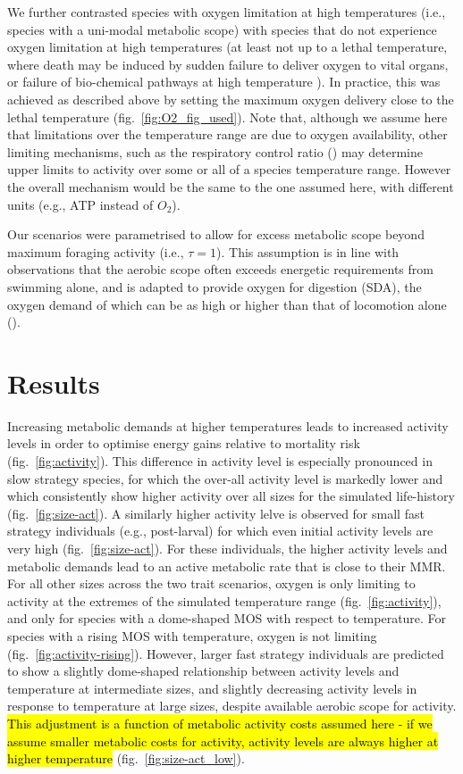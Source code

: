 \documentclass[11pt]{article}\usepackage[]{graphicx}\usepackage[]{color,soul}
\begin{document}
We further contrasted species with oxygen limitation at high temperatures (i.e., species with a uni-modal metabolic scope) with species that do not experience oxygen limitation at high temperatures (at least not up to a lethal temperature, where death may be induced by sudden failure to deliver oxygen to vital organs, or failure of bio-chemical pathways at high temperature \citealt{salin_inadequate_2016,iftikar_mitochondria_2013}). In practice, this was achieved as described above by setting the maximum oxygen delivery close to the lethal temperature (fig.~\ref{fig:O2_fig_used}). Note that, although we assume here that limitations over the temperature range are due to oxygen availability, other limiting mechanisms, such as the respiratory control ratio (\citealt{salin_inadequate_2016,iftikar_mitochondria_2013}) may determine upper limits to activity over some or all of a species temperature range. However the overall mechanism would be the same to the one assumed here, with different units (e.g., ATP instead of $O_2$).

Our scenarios were parametrised to allow for excess metabolic scope beyond maximum foraging activity (i.e., $\tau=1$). This assumption is in line with observations that the aerobic scope often exceeds energetic requirements from swimming alone, and is adapted to provide oxygen for digestion (SDA), the oxygen demand of which can be as high or higher than that of locomotion alone (\citealt{priede_metabolic_1985}).

\section*{Results}

Increasing metabolic demands at higher temperatures leads to increased activity levels in order to optimise energy gains relative to mortality risk (fig.~\ref{fig:activity}). This difference in activity level is especially pronounced in slow strategy species, for which the over-all activity level is markedly lower and which consistently show higher activity over all sizes for the simulated life-history (fig.~\ref{fig:size-act}). A similarly higher activity lelve is observed for small fast strategy individuals (e.g., post-larval) for which even initial activity levels are very high (fig.~\ref{fig:size-act}). For these individuals, the higher activity levels and metabolic demands lead to an active metabolic rate that is close to their MMR. For all other sizes across the two trait scenarios, oxygen is only limiting to activity at the extremes of the simulated temperature range (fig.~\ref{fig:activity}), and only for species with a dome-shaped MOS with respect to temperature. For species with a rising MOS with temperature, oxygen is not limiting (fig.~\ref{fig:activity-rising}). However, larger fast strategy individuals are predicted to show a slightly dome-shaped relationship between activity levels and temperature at intermediate sizes, and slightly decreasing activity levels in response to temperature at large sizes, despite available aerobic scope for activity. \hl{This adjustment is a function of metabolic activity costs assumed here - if we assume smaller metabolic costs for activity, activity levels are always higher at higher temperature} (fig.~\ref{fig:size-act_low}).
\end{document}
